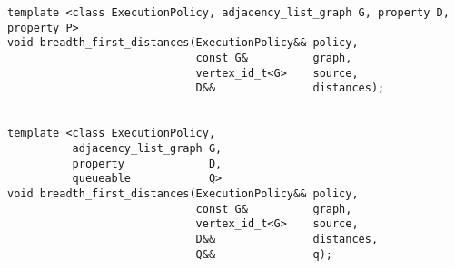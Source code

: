 \begin{lstlisting}
template <class ExecutionPolicy, adjacency_list_graph G, property D, property P>
void breadth_first_distances(ExecutionPolicy&& policy,
                             const G&          graph,
                             vertex_id_t<G>    source,
                             D&&               distances);


template <class ExecutionPolicy,
          adjacency_list_graph G,
          property             D,
          queueable            Q>
void breadth_first_distances(ExecutionPolicy&& policy,
                             const G&          graph,
                             vertex_id_t<G>    source,
                             D&&               distances,
                             Q&&               q);

\end{lstlisting}

